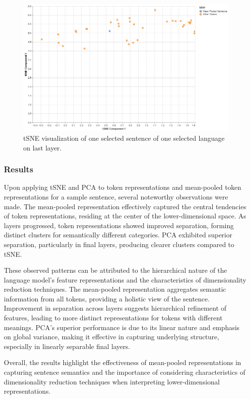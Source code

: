 \documentclass[11pt]{article}
\begin{document}
\begin{figure}[ht]
\centering
\includegraphics[width=0.9\columnwidth]{oneSentenceLang_lastLayer_tsne.png}
\caption{tSNE visualization of one selected sentence of one selected language on last layer.}
\end{figure}

\subsubsection{Results}

Upon applying tSNE and PCA to token representations and mean-pooled token representations for a sample sentence, several noteworthy observations were made. The mean-pooled representation effectively captured the central tendencies of token representations, residing at the center of the lower-dimensional space. As layers progressed, token representations showed improved separation, forming distinct clusters for semantically different categories. PCA exhibited superior separation, particularly in final layers, producing clearer clusters compared to tSNE.

These observed patterns can be attributed to the hierarchical nature of the language model's feature representations and the characteristics of dimensionality reduction techniques. The mean-pooled representation aggregates semantic information from all tokens, providing a holistic view of the sentence. Improvement in separation across layers suggests hierarchical refinement of features, leading to more distinct representations for tokens with different meanings. PCA's superior performance is due to its linear nature and emphasis on global variance, making it effective in capturing underlying structure, especially in linearly separable final layers. 

Overall, the results highlight the effectiveness of mean-pooled representations in capturing sentence semantics and the importance of considering characteristics of dimensionality reduction techniques when interpreting lower-dimensional representations.
\end{document}
